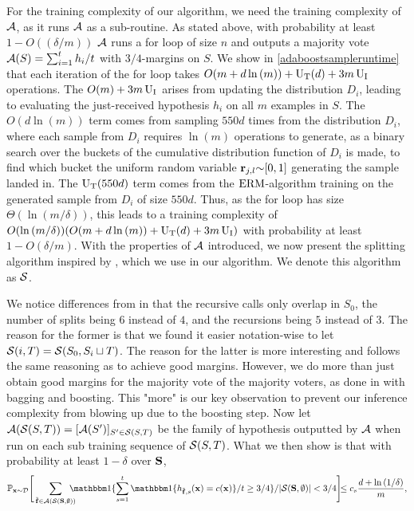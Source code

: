 For the training complexity of our algorithm, we need the training complexity of $\mathcal{A}$, as it runs $ \mathcal{A} $ as a sub-routine. As stated above, with probability at least $1-O((\delta/m))$ $ \mathcal{A} $ runs a for loop of size $ n $ and outputs a majority vote $\mathcal{A}(S)= \sum_{i=1}^{t} h_i/t $ with $ 3/4 $-margins on $ S.$ We show in \cref{adaboostsampleruntime} that each iteration of the for loop takes $ O(m+d\ln{\left(m \right)})+\operatorname{U_{T}}(d)+3m\operatorname{U_{I}} $ operations. The $ O(m)+3m\operatorname{U_{I}}$ arises from updating the distribution $ D_{i} $, leading to evaluating the just-received hypothesis $ h_i $  on all $ m $ examples in $ S.$ The $O(d\ln{\left(m \right)} ) $ term comes from sampling $ 550d $ times from the distribution $D_{i}$, where each sample from $ D_{i} $  requires $ \ln{\left(m \right)} $ operations to generate, as a binary search over the buckets of the cumulative distribution function of $ D_{i} $ is made, to find which bucket the uniform random variable $ \mathbf{r}_{j,l} {\sim} [0,1]$ generating the sample landed in. The $ \operatorname{U_{T}}(550d) $ term comes from the $ \mathrm{ERM} $-algorithm training on the generated sample from $ D_{i} $ of size $ 550d $. Thus, as the for loop has size $\Theta(\ln{\left(m/\delta \right)} ) $,  this leads to a training complexity of $ O(\ln{\left(m/\delta \right)} )(O(m+d\ln{\left(m \right)})+\operatorname{U_{T}}(d)+3m\operatorname{U_{I}} ) $ with probability at least $ 1-O(\delta/m)$. With the properties of $ \mathcal{A} $ introduced, we now present the splitting algorithm inspired by \cite{hannekeoptimal}, which we use in our algorithm. We denote this algorithm as $ \mathcal{S} $.

We notice differences from \cite{hannekeoptimal} in that the recursive calls only overlap in $ S_{0} $, the number of splits being $ 6 $ instead of $ 4 $,  and the recursions being $ 5 $ instead of $ 3 $. The reason for the former is that we found it easier notation-wise to let $ \mathcal{S}(i,T)=\mathcal{S}(S_{0},S_{i}\sqcup T) $. The reason for the latter is more interesting and follows the same reasoning as \cite{baggingoptimalPAClearner} to achieve good margins. However, we do more than just obtain good margins for the majority vote of the majority voters, as done in \cite{baggingoptimalPAClearner} with bagging and boosting. This "more" is our key observation to prevent our inference complexity from blowing up due to the boosting step. Now let $ \mathcal{A}(\mathcal{S}(S,T)) =[\mathcal{A}(S')]_{S'\in \mathcal{S}(S,T)} $ be the family of hypothesis outputted by $ \mathcal{A} $ when run on each sub training sequence of $ \mathcal{S}(S,T) $. What we then show is that with probability at least $ 1-\delta $ over $ \mathbf{S} $,          
\begin{align}\label{eq:deterministic error}
  \vspace{-0.4cm}
    \p_{\rx\sim\cD} \Bigg[  
      \sum_{\rf\in \cA(\cS(\rS,\emptyset))} \negmedspace \negmedspace \negmedspace \negmedspace \ind\{\sum_{s=1}^{t}  \ind\{h_{\rf,s}(\rx)=c(\rx)\}/t\geq 3/4\}/|\cS(\rS,\emptyset)|
       <3/4\Bigg]\negmedspace \negmedspace \leq \cs \frac{d+\ln{\left(1/\delta \right)}}{m},
  \end{align}
